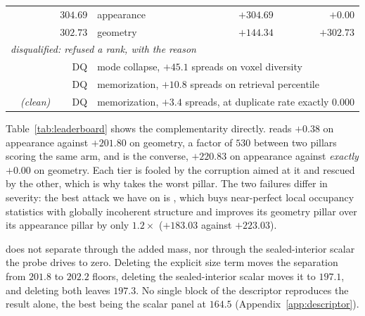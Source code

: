 \begin{table}[t]
\begin{tabular}{rlrlrr}
  & \monochrome{}                    & $304.69$ & appearance & $+304.69$ & $+0.00$ \\
  & \copynoise{}                     & $302.73$ & geometry   & $+144.34$ & $+302.73$ \\
\midrule
\multicolumn{6}{l}{\emph{disqualified: refused a rank, with the reason}} \\
  & \singlemode{}                    & DQ & \multicolumn{3}{l}{mode collapse, $+45.1$ spreads on voxel diversity} \\
  & \traincopy{}                     & DQ & \multicolumn{3}{l}{memorization, $+10.8$ spreads on retrieval percentile} \\
  & \voxarun{} \emph{(clean)}        & DQ & \multicolumn{3}{l}{memorization, $+3.4$ spreads, at duplicate rate exactly $0.000$} \\
\bottomrule
\end{tabular}
\end{table}

Table~\ref{tab:leaderboard} shows the complementarity directly. \solidify{} reads $+0.38$
on appearance against $+201.80$ on geometry, a factor of $530$ between two pillars scoring
the same arm, and \matshuffle{} is the converse, $+220.83$ on appearance against
\emph{exactly} $+0.00$ on geometry. Each tier is fooled by the corruption aimed at it and
rescued by the other, which is why \blockscore{} takes the worst pillar. The two failures
differ in severity: the best attack we have on \vkid{} is \patchstitch{}, which buys
near-perfect local occupancy statistics with globally incoherent structure and improves its
geometry pillar over its appearance pillar by only $1.2\times$ ($+183.03$ against
$+223.03$).

\vkid{} does not separate \solidify{} through the added mass, nor through the
sealed-interior scalar the probe drives to zero. Deleting the explicit size term moves the
separation from $201.8$ to $202.2$ floors, deleting the sealed-interior scalar moves it to
$197.1$, and deleting both leaves $197.3$. No single block of the descriptor reproduces the
result alone, the best being the scalar panel at $164.5$ (Appendix~\ref{app:descriptor}).

